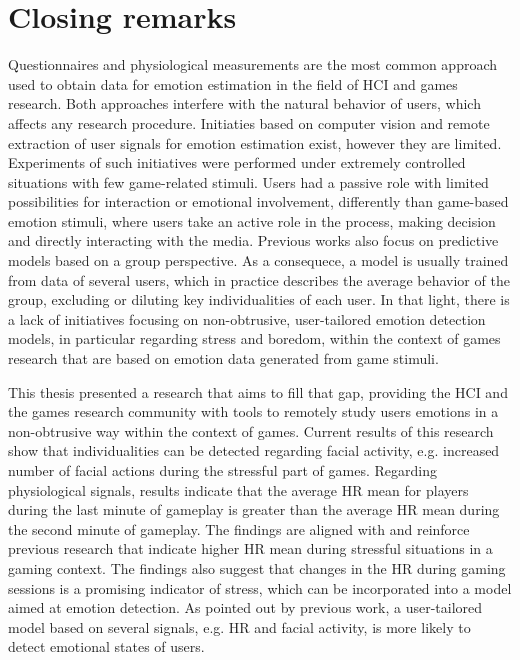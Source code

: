 \chapter{Closing remarks}
\label{ch:closing}

Questionnaires and physiological measurements are the most common approach used to obtain data for emotion estimation in the field of HCI and games research. Both approaches interfere with the natural behavior of users, which affects any research procedure. Initiaties based on computer vision and remote extraction of user signals for emotion estimation exist, however they are limited. Experiments of such initiatives were performed under extremely controlled situations with few game-related stimuli. Users had a passive role with limited possibilities for interaction or emotional involvement, differently than game-based emotion stimuli, where users take an active role in the process, making decision and directly interacting with the media. Previous works also focus on predictive models based on a group perspective. As a consequece, a model is usually trained from data of several users, which in practice describes the average behavior of the group, excluding or diluting key individualities of each user. In that light, there is a lack of initiatives focusing on non-obtrusive, user-tailored emotion detection models, in particular regarding stress and boredom, within the context of games research that are based on emotion data generated from game stimuli.

This thesis presented a research that aims to fill that gap, providing the HCI and the games research community with tools to remotely study users emotions in a non-obtrusive way within the context of games. Current results of this research show that individualities can be detected regarding facial activity, e.g. increased number of facial actions during the stressful part of games. Regarding physiological signals, results indicate that the average HR mean for players during the last minute of gameplay is greater than the average HR mean during the second minute of gameplay. The findings are aligned with and reinforce previous research that indicate higher HR mean during stressful situations in a gaming context. The findings also suggest that changes in the HR during gaming sessions is a promising indicator of stress, which can be incorporated into a model aimed at emotion detection. As pointed out by previous work, a user-tailored model based on several signals, e.g. HR and facial activity, is more likely to detect emotional states of users.

